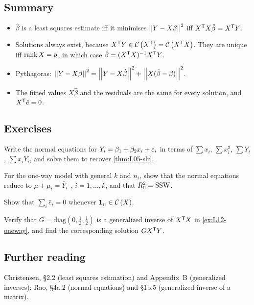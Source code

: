 \subsection{Summary}
\begin{itemize}
  \item $\hat\beta$ is a least squares estimate iff it minimises $\left|\left|Y-X\beta\right|\right|^2$ iff $X^{\mathsf T} X\hat\beta=X^{\mathsf T} Y$.
  \item Solutions always exist, because $X^{\mathsf T} Y\in\mathcal{C}\left(X^{\mathsf T}\right)=\mathcal{C}\left(X^{\mathsf T} X\right)$. They are unique iff $\operatorname{rank} X=p$, in which case $\hat\beta=(X^{\mathsf T} X)^{-1}X^{\mathsf T} Y$.
  \item Pythagoras: $\left|\left|Y-X\beta\right|\right|^2=\left|\left|Y-X\hat\beta\right|\right|^2+\left|\left|X(\hat\beta-\beta)\right|\right|^2$.
  \item The fitted values $X\hat\beta$ and the residuals are the same for every solution, and $X^{\mathsf T}\hat e=0$.
\end{itemize}

\subsection{Exercises}
\begin{problem}\label{prob:L12-1}
Write the normal equations for $Y_i=\beta_1+\beta_2x_i+\varepsilon_i$ in terms of $\sum x_i$, $\sum x_i^2$, $\sum Y_i$, $\sum x_iY_i$, and solve them to recover \cref{thm:L05-slr}.
\end{problem}
\begin{problem}\label{prob:L12-2}
For the one-way model with general $k$ and $n_i$, show that the normal equations reduce to $\mu+\mu_i=\bar Y_{i\cdot}$, $i=1,\dots,k$, and that $R_0^2=\mathrm{SSW}$.
\end{problem}
\begin{problem}\label{prob:L12-3}
Show that $\sum_i\hat e_i=0$ whenever $\mathbf 1_n\in\mathcal{C}\left(X\right)$.
\end{problem}
\begin{problem}\label{prob:L12-4}
Verify that $G=\mathrm{diag}(0,\tfrac12,\tfrac12)$ is a generalized inverse of $X^{\mathsf T} X$ in \cref{ex:L12-oneway}, and find the corresponding solution $GX^{\mathsf T} Y$.
\end{problem}

\subsection{Further reading}
Christensen, \S2.2 (least squares estimation) and Appendix~B (generalized inverses); Rao, \S4a.2
(normal equations) and \S1b.5 (generalized inverse of a matrix).
